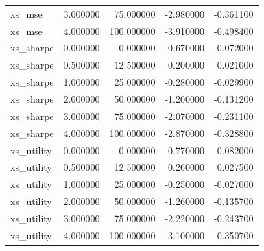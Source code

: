\begin{table}
\begin{tabular}{lrrrr}
xs\_mse & 3.000000 & 75.000000 & -2.980000 & -0.361100 \\
xs\_mse & 4.000000 & 100.000000 & -3.910000 & -0.498400 \\
xs\_sharpe & 0.000000 & 0.000000 & 0.670000 & 0.072000 \\
xs\_sharpe & 0.500000 & 12.500000 & 0.200000 & 0.021000 \\
xs\_sharpe & 1.000000 & 25.000000 & -0.280000 & -0.029900 \\
xs\_sharpe & 2.000000 & 50.000000 & -1.200000 & -0.131200 \\
xs\_sharpe & 3.000000 & 75.000000 & -2.070000 & -0.231100 \\
xs\_sharpe & 4.000000 & 100.000000 & -2.870000 & -0.328800 \\
xs\_utility & 0.000000 & 0.000000 & 0.770000 & 0.082000 \\
xs\_utility & 0.500000 & 12.500000 & 0.260000 & 0.027500 \\
xs\_utility & 1.000000 & 25.000000 & -0.250000 & -0.027000 \\
xs\_utility & 2.000000 & 50.000000 & -1.260000 & -0.135700 \\
xs\_utility & 3.000000 & 75.000000 & -2.220000 & -0.243700 \\
xs\_utility & 4.000000 & 100.000000 & -3.100000 & -0.350700 \\
\bottomrule
\end{tabular}
\end{table}
